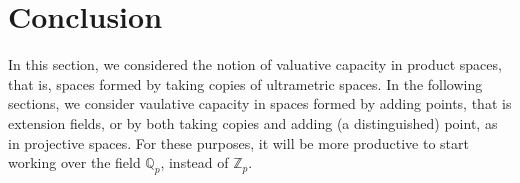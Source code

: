\section*{Conclusion}
In this section, we considered the notion of valuative capacity in product spaces, that is, spaces formed by taking copies of ultrametric spaces. In the following sections, we consider  vaulative capacity in spaces formed by adding points, that is extension fields, or by both taking copies and adding (a distinguished) point, as in projective spaces. For these purposes, it will be more productive to start working over the field $\mathbb{Q}_p$, instead of $\mathbb{Z}_p$.




































